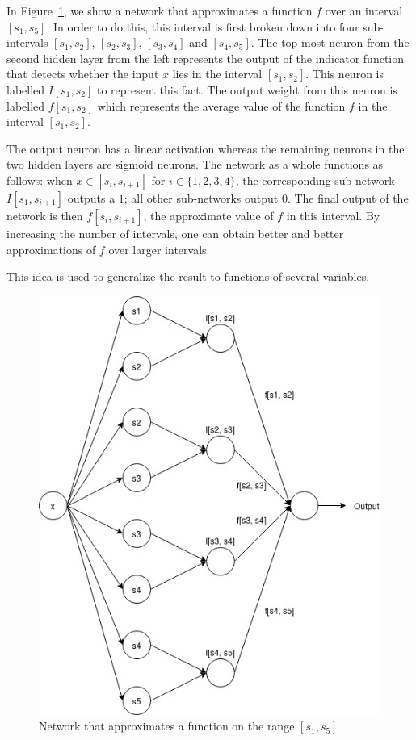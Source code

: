 In Figure~\ref{fig:one_variable_function}, we show a network that approximates 
a function $f$ over an interval $[s_1, s_5]$. In order to do this, this interval 
is first broken down into four sub-intervals $[s_1, s_2]$, $[s_2, s_3]$, $[s_3, s_4]$
and $[s_4, s_5]$. The top-most neuron from the second hidden layer from the left 
represents the output of the indicator function that detects whether the input $x$ 
lies in the interval $[s_1, s_2]$. This neuron is labelled $I[s_1, s_2]$ to 
represent this fact. The output weight from this neuron is labelled $f[s_1, s_2]$
which represents the average value of the function $f$ in the interval $[s_1, s_2]$.

The output neuron has a linear activation whereas the remaining neurons in the two 
hidden layers are sigmoid neurons. The network as a whole functions as follows: 
when $x \in [s_i, s_{i + 1}]$ for $i \in \{1, 2, 3, 4\}$, the corresponding sub-network 
$I[s_1, s_{i + 1}]$ outputs a $1$; all other sub-networks output $0$. The final output
of the network is then $f[s_i, s_{i + 1}]$, the approximate value of $f$ in this interval. 
By increasing the number of intervals, one can obtain better and better approximations 
of $f$ over larger intervals. 

This idea is used to generalize the result to functions of several variables. 

\begin{figure}[ht]
\begin{center}
\includegraphics[scale=0.5]{OneVariableFunctions.jpg}
\end{center}
\caption{Network that approximates a function on the range $[s_1, s_5]$}
\label{fig:one_variable_function}
\end{figure}

